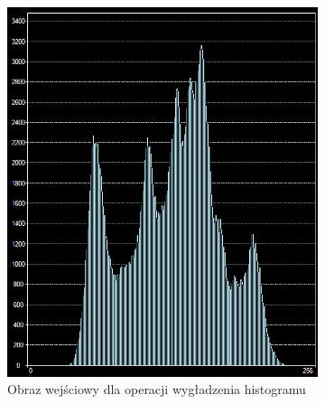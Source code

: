\begin{figure}
  \centering
  \begin{subfigure}[b]{0.45\textwidth}
    \includegraphics[width=\textwidth]{img/smooth-histogram-before}
    \caption{Obraz wejściowy dla operacji wygładzenia histogramu}
    \label{fig:equalize_histogram_before}
  \end{subfigure}
  ~
  \begin{subfigure}[b]{0.45\textwidth}

\end{subfigure}
\end{figure}
